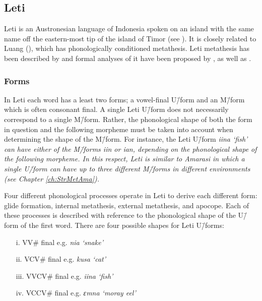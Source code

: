 \subsection{Leti}\label{sec:Let}
Leti is an Austronesian language of Indonesia spoken on an island
with the same name off the eastern-most tip of the island of Timor
(see ).
It is closely related to Luang (),
which has phonologically conditioned metathesis.
Leti metathesis has been described by \citet{en94,en96,en04}
and formal analyses of it have been proposed by \cite{huen95},
as well as \cite{hu98}.

\subsubsection{Forms}\label{sec:LetFor}
In Leti each word has a least two forms;
a vowel-final U\=/form and an M\=/form which is often consonant final.
A single Leti U\=/form does not necessarily correspond to a single M\=/form.
Rather, the phonological shape of both the form in question
and the following morpheme must be taken into account when determining the shape of the M\=/form.
For instance, the Leti U\=/form \it{iina} `fish'
can have either of the M\=/forms \it{iin} or \it{ian},
depending on the phonological shape of the following morpheme.
In this respect, Leti is similar to Amarasi in which a single
U\=/form can have up to three different M\=/forms in different environments (see Chapter \ref{ch:StrMetAma}).

Four different phonological processes operate in Leti to derive each different form:
glide formation, internal metathesis, external metathesis, and apocope.
Each of these processes is described with reference to the phonological shape of the U\=/form of the first word.
There are four possible shapes for Leti U\=/forms:

\begin{itemize}
	\item[i.] VV{\#} final e.g. \it{nia} `snake'
	\item[ii.] VCV{\#} final e.g. \it{kusa} `cat'
	\item[iii.] V{}V{}CV{\#} final e.g. \it{iina} `fish'
	\item[iv.] VCCV{\#} final e.g. \it{ɛmna} `moray eel'
\end{itemize}

